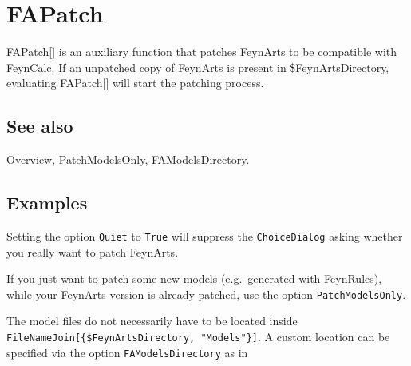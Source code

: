 \documentclass[../FeynCalcManual.tex]{subfiles}
\begin{document}
\hypertarget{fapatch}{%
\section{FAPatch}\label{fapatch}}

FAPatch{[}{]} is an auxiliary function that patches FeynArts to be
compatible with FeynCalc. If an unpatched copy of FeynArts is present in
\$FeynArtsDirectory, evaluating FAPatch{[}{]} will start the patching
process.

\subsection{See also}

\hyperlink{toc}{Overview}, \hyperlink{patchmodelsonly}{PatchModelsOnly},
\hyperlink{famodelsdirectory}{FAModelsDirectory}.

\subsection{Examples}

Setting the option \texttt{Quiet} to \texttt{True} will suppress the
\texttt{ChoiceDialog} asking whether you really want to patch FeynArts.

\begin{Shaded}
\begin{Highlighting}[]
\end{Highlighting}
\end{Shaded}

If you just want to patch some new models (e.g.~generated with
FeynRules), while your FeynArts version is already patched, use the
option \texttt{PatchModelsOnly}.

\begin{Shaded}
\begin{Highlighting}[]
\end{Highlighting}
\end{Shaded}

The model files do not necessarily have to be located inside
\texttt{FileNameJoin[\allowbreak{}\{\allowbreak{}\$FeynArtsDirectory,\ \allowbreak{}"Models"\}]}.
A custom location can be specified via the option
\texttt{FAModelsDirectory} as in

\begin{Shaded}
\begin{Highlighting}[]
\CommentTok{(*FAPatch[PatchModelsOnly{-}\textgreater{}True,FAModelsDirectory{-}\textgreater{}}
\CommentTok{FileNameJoin[\{ParentDirectory@NotebookDirectory[],"FeynArts","MyModel"\}]]*)}
\end{Highlighting}
\end{Shaded}
\end{document}
